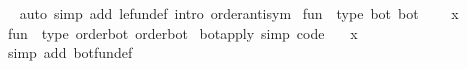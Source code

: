 \begin{isabellebody}
\isadelimproof
\ %
\endisadelimproof
%
\isatagproof
{}\isamarkupfalse%
\isanewline
{}\isamarkupfalse%
\ {\isacharparenleft}{\kern0pt}auto\ simp\ add{\isacharcolon}{\kern0pt}\ le{\isacharunderscore}{\kern0pt}fun{\isacharunderscore}{\kern0pt}def\ intro{\isacharcolon}{\kern0pt}\ order{\isachardot}{\kern0pt}antisym{\isacharparenright}{\kern0pt}%
\endisatagproof
{\isafoldproof}%
%
\isadelimproof
%
\endisadelimproof
\isanewline
\isanewline
{}\isamarkupfalse%
\ {\isachardoublequoteopen}fun{\isachardoublequoteclose}\ {\isacharcolon}{\kern0pt}{\isacharcolon}{\kern0pt}\ {\isacharparenleft}{\kern0pt}type{\isacharcomma}{\kern0pt}\ bot{\isacharparenright}{\kern0pt}\ bot\isanewline
{}\isanewline
\isanewline
{}\isamarkupfalse%
\isanewline
\ \ {\isachardoublequoteopen}{\isasymbottom}\ {\isacharequal}{\kern0pt}\ {\isacharparenleft}{\kern0pt}{\isasymlambda}x{\isachardot}{\kern0pt}\ {\isasymbottom}{\isacharparenright}{\kern0pt}{\isachardoublequoteclose}\isanewline
\isanewline
{}\isamarkupfalse%
%
\isadelimproof
\ %
\endisadelimproof
%
\isatagproof
\isacommand{{\isachardot}{\kern0pt}{\isachardot}{\kern0pt}}\isamarkupfalse%
%
\endisatagproof
{\isafoldproof}%
%
\isadelimproof
%
\endisadelimproof
\isanewline
\isanewline
{}\isamarkupfalse%
\isanewline
\isanewline
{}\isamarkupfalse%
\ {\isachardoublequoteopen}fun{\isachardoublequoteclose}\ {\isacharcolon}{\kern0pt}{\isacharcolon}{\kern0pt}\ {\isacharparenleft}{\kern0pt}type{\isacharcomma}{\kern0pt}\ order{\isacharunderscore}{\kern0pt}bot{\isacharparenright}{\kern0pt}\ order{\isacharunderscore}{\kern0pt}bot\isanewline
{}\isanewline
\isanewline
{}\isamarkupfalse%
\ bot{\isacharunderscore}{\kern0pt}apply\ {\isacharbrackleft}{\kern0pt}simp{\isacharcomma}{\kern0pt}\ code{\isacharbrackright}{\kern0pt}{\isacharcolon}{\kern0pt}\isanewline
\ \ {\isachardoublequoteopen}{\isasymbottom}\ x\ {\isacharequal}{\kern0pt}\ {\isasymbottom}{\isachardoublequoteclose}\isanewline
%
\isadelimproof
\ \ %
\endisadelimproof
%
\isatagproof
{}\isamarkupfalse%
\ {\isacharparenleft}{\kern0pt}simp\ add{\isacharcolon}{\kern0pt}\ bot{\isacharunderscore}{\kern0pt}fun{\isacharunderscore}{\kern0pt}def{\isacharparenright}{\kern0pt}%
\endisatagproof
{\isafoldproof}%
%
\isadelimproof
\isanewline
%
\endisadelimproof
\isanewline
{}\isamarkupfalse%
%
\isadelimproof
\ %
\endisadelimproof
%
\isatagproof
{}\isamarkupfalse%
\isanewline
{}\isamarkupfalse%

\end{isabellebody}
